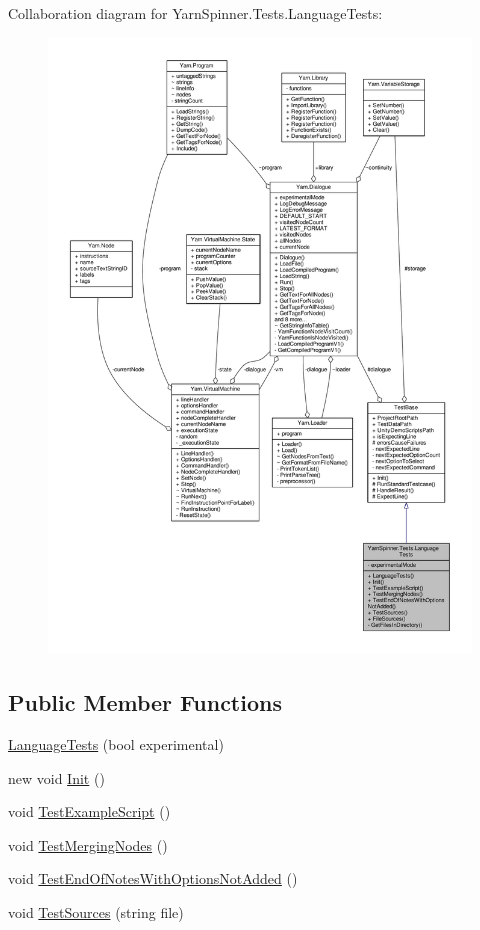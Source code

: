 Collaboration diagram for Yarn\-Spinner.\-Tests.\-Language\-Tests\-:
\nopagebreak
\begin{figure}[H]
\begin{center}
\leavevmode
\includegraphics[width=350pt]{a00823}
\end{center}
\end{figure}
\subsection*{Public Member Functions}
\begin{DoxyCompactItemize}
\item 
\hyperlink{a00128_a29423f19f442c991bb2323c071980aff}{Language\-Tests} (bool experimental)
\item 
new void \hyperlink{a00128_ae0d1fb752df07e24b0d11db25e0c17c4}{Init} ()
\item 
void \hyperlink{a00128_a1d044fd44e610a35ef09d486eb06ee37}{Test\-Example\-Script} ()
\item 
void \hyperlink{a00128_a4da987e2dbc65b35cc6bd07392f71453}{Test\-Merging\-Nodes} ()
\item 
void \hyperlink{a00128_a6cc57344745b5fb315abdeacdd23b659}{Test\-End\-Of\-Notes\-With\-Options\-Not\-Added} ()
\item 
void \hyperlink{a00128_a1fb5f217de912475860fcde067418f83}{Test\-Sources} (string file)
\end{DoxyCompactItemize}
